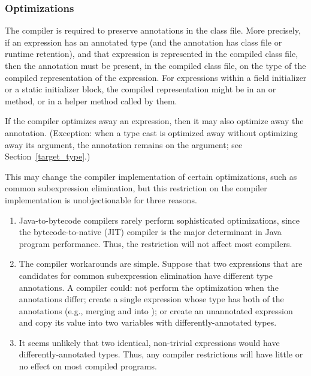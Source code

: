 \documentclass[10pt]{article}
\begin{document}
\subsubsection{Optimizations\label{mods-optimization}}


The compiler is required to preserve annotations in the class file.  More
precisely, if an expression has an annotated type (and the annotation has
class file or runtime retention), and that expression is represented
in the compiled class file, then the annotation must be present, in the
compiled class file, on the type of the compiled representation of the
expression.  For expressions within a field initializer or a static
initializer block, the compiled representation might be in an 
or  method, or in a helper method called by them.

If the compiler optimizes away an expression, then it may also
optimize away the annotation.  (Exception:  when a type cast
is optimized away without optimizing away its argument, the
annotation remains on the argument; see Section~\ref{target_type}.)



This may change the compiler implementation of certain optimizations, such
as common subexpression elimination, but this restriction on the compiler
implementation is unobjectionable for three reasons.
\begin{enumerate}
\item
Java-to-bytecode compilers rarely perform sophisticated
optimizations, since the bytecode-to-native (JIT) compiler is the major
determinant in Java program performance.  Thus, the restriction will not
affect most compilers.
\item
The compiler workarounds are simple.  Suppose that two expressions
that are candidates for common subexpression elimination
have different type annotations.
A compiler could:  not perform the optimization when the annotations
differ; create a single expression whose type has both of the annotations
(e.g., merging  and 
into );
or create an unannotated expression and copy its value into two variables
with differently-annotated types.
% 
\item
It seems unlikely that two identical, non-trivial expressions would
have differently-annotated types.  Thus, any compiler restrictions will
have little or no effect on most compiled programs.
\end{enumerate}
\end{document}
